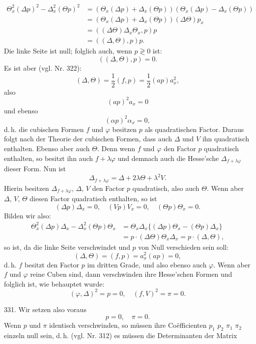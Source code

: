 \[
\begin{aligned}
\Theta_x^2(\Delta p)^2 - \Delta_x^2(\Theta p)^2 &= (\Theta_x(\Delta p)+\Delta_x(\Theta p))(\Theta_x(\Delta p)-\Delta_x(\Theta p))\\
&= (\Theta_x(\Delta p)+\Delta_x(\Theta p))(\Delta\Theta)p_x\\
&= ((\Delta\Theta)\Delta_x\Theta_x,p)p\\
&= ((\Delta,\Theta),p)p.
\end{aligned}
\]
Die linke Seite ist null; folglich auch, wenn $p\gtrless0$ ist:
\[
((\Delta,\Theta),p) = 0.
\]
Es ist aber (vgl. Nr. 322):
\[
(\Delta,\Theta) = \frac{1}{2}(f,p) = \frac{1}{2}(ap)a_x^2,
\]
also
\[
(ap)^2a_x = 0
\]
und ebenso
\[
(\alpha p)^2\alpha_x = 0,
\]
d.\,h. die cubischen Formen $f$ und $\varphi$ besitzen $p$ als quadratischen Factor. Daraus folgt nach der Theorie der cubischen Formen, dass auch $\Delta$ und $V$ ihn quadratisch enthalten. Ebenso aber auch $\Theta$. Denn wenn $f$ und $\varphi$ den Factor $p$ quadratisch enthalten, so besitzt ihn auch $f+\lambda\varphi$ und demnach auch die Hesse'sche $\Delta_{f+\lambda\varphi}$ dieser Form. Nun ist
\[
\Delta_{f+\lambda\varphi} = \Delta + 2\lambda\Theta + \lambda^2V.
\]
Hierin besitzen $\Delta_{f+\lambda\varphi}$, $\Delta$, $V$ den Factor $p$ quadratisch, also auch $\Theta$. Wenn aber $\Delta$, $V$, $\Theta$ diesen Factor quadratisch enthalten, so ist
\[
(\Delta p)\Delta_x = 0,\quad (Vp)V_x = 0,\quad (\Theta p)\Theta_x = 0.
\]
Bilden wir also:
\[
\begin{aligned}
\Theta_x^2(\Delta p)\Delta_x - \Delta_x^2(\Theta p)\Theta_x &= \Theta_x\Delta_x\{(\Delta p)\Theta_x-(\Theta p)\Delta_x\}\\
&= p\cdot(\Delta\Theta)\Theta_x\Delta_x = p\cdot(\Delta,\Theta),
\end{aligned}
\]
so ist, da die linke Seite verschwindet und $p$ von Null verschieden sein soll:
\[
(\Delta,\Theta) = (f,p) = a_x^2(ap) = 0,
\]
d.\,h. $f$ besitzt den Factor $p$ im dritten Grade, und also ebenso auch $\varphi$. Wenn aber $f$ und $\varphi$ reine Cuben sind, dann verschwinden ihre Hesse'schen Formen und folglich ist, wie behauptet wurde:
\[
(\varphi,\Delta)^2 = p = 0,\quad (f,V)^2 = \pi = 0.
\]

331.  Wir setzen also voraus
\[
p=0,\quad \pi=0.
\]
Wenn $p$ und $\pi$ identisch verschwinden, so m\"ussen ihre Co\"efficienten $p_1$ $p_2$ $\pi_1$ $\pi_2$ einzeln null sein, d.\,h. (vgl. Nr. 312) es m\"ussen die Determinanten der Matrix


